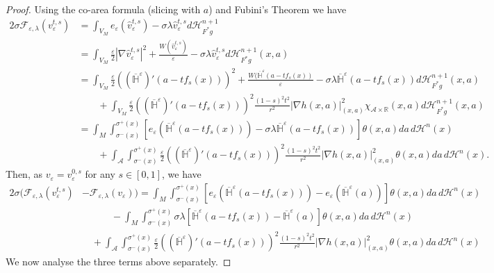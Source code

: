 \documentclass[11pt]{article}
\begin{document}
\begin{proof}
Using the co-area formula (slicing with $a$) and Fubini's Theorem we have
\begin{align*}
    2\sigma\mathcal{F}_{\varepsilon,\lambda}(v^{t,s}_\varepsilon) &= \int_{V_M} e_\varepsilon(\hat{v}^{t,s}_\varepsilon) - \sigma\lambda\hat{v}^{t,s}_\varepsilon d\mathcal{H}^{n+1}_{F^*g}\\
    &= \int_{V_M} \frac{\varepsilon}{2}|\nabla \hat{v}^{t,s}_\varepsilon|^2 + \frac{W(\hat{v}^{t,s}_\varepsilon)}{\varepsilon} - \sigma\lambda\hat{v}^{t,s}_\varepsilon d\mathcal{H}^{n+1}_{F^*g}(x,a)\\
    &= \int_{V_M} \frac{\varepsilon}{2}\left((\overline{\mathbb{H}}^\varepsilon)'(a - tf_s(x))\right)^2 + \frac{W(\overline{\mathbb{H}}^\varepsilon(a - tf_s(x))}{\varepsilon} - \sigma\lambda\overline{\mathbb{H}}^\varepsilon(a - tf_s(x)) d\mathcal{H}^{n+1}_{F^*g}(x,a)\\
    &\quad\quad + \int_{V_M} \frac{\varepsilon}{2}\left((\overline{\mathbb{H}}^\varepsilon)'(a - tf_s(x))\right)^2 \frac{(1-s)^2t^2}{r^2}|\nabla h(x,a)|_{(x,a)}^2  \chi_{\mathcal{A} \times \mathbb{R}}(x,a) d\mathcal{H}^{n+1}_{F^*g}(x,a)\\
    &= \int_M \int_{\sigma^-(x)}^{\sigma^+(x)} \left[e_\varepsilon\left(\overline{\mathbb{H}}^\varepsilon(a - tf_s(x))\right) - \sigma\lambda\overline{\mathbb{H}}^\varepsilon(a - tf_s(x)) \right]\theta(x,a) da\, d\mathcal{H}^n(x)\\
    &\quad\quad + \int_{\mathcal{A}} \int_{\sigma^-(x)}^{\sigma^+(x)} \frac{\varepsilon}{2}\left((\overline{\mathbb{H}}^\varepsilon)'(a - tf_s(x))\right)^2 \frac{(1-s)^2t^2}{r^2}|\nabla h(x,a)|_{(x,a)}^2 \theta(x,a) da\, d\mathcal{H}^n(x).
\end{align*}
Then, as $v_\varepsilon = v^{0,s}_\varepsilon$ for any $s \in [0,1]$, we have
\begin{align}
    \label{eqn: energy term}
    2\sigma(\mathcal{F}_{\varepsilon,\lambda}(v^{t,s}_\varepsilon) &- \mathcal{F}_{\varepsilon,\lambda}(v_\varepsilon)) =  \int_M \int_{\sigma^-(x)}^{\sigma^+(x)} \left[e_\varepsilon\left(\overline{\mathbb{H}}^\varepsilon(a - tf_s(x))\right) - e_\varepsilon\left(\overline{\mathbb{H}}^\varepsilon(a)\right) \right]\theta(x,a) da\, d\mathcal{H}^n(x)\\
    \label{eqn: 1d term}
    &\quad\quad\quad -\int_M \int_{\sigma^-(x)}^{\sigma^+(x)} \sigma\lambda\left[\overline{\mathbb{H}}^\varepsilon(a - tf_s(x)) - \overline{\mathbb{H}}^\varepsilon(a) \right]\theta(x,a) da\, d\mathcal{H}^n(x)\\
    \label{eqn: gradient term}
    &\quad + \int_{\mathcal{A}} \int_{\sigma^-(x)}^{\sigma^+(x)} \frac{\varepsilon}{2}\left((\overline{\mathbb{H}}^\varepsilon)'(a - tf_s(x))\right)^2 \frac{(1-s)^2t^2}{r^2}|\nabla h(x,a)|_{(x,a)}^2 \theta(x,a) da\, d\mathcal{H}^n(x)
\end{align}
We now analyse the three terms above separately. 


\end{proof}
\end{document}
